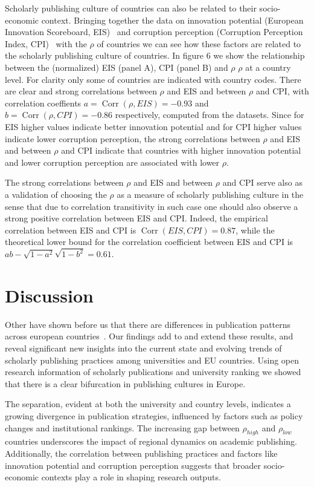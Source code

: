 \documentclass[amsfonts, amssymb, prl, superscriptaddress, notitlepage, twocolumn, nofootinbib]{revtex4-2}
\newcommand{\Corr}{\operatorname{Corr}}
\begin{document}
Scholarly publishing culture of countries can also be related to their socio-economic context. Bringing together the data on innovation potential (European Innovation Scoreboard, EIS)~\cite{european_innovation_scoreboard_2023} and corruption perception (Corruption Perception Index, CPI)~\cite{transparency_international_cpi_2022} with the $\rho$ of countries we can see how these factors are related to the scholarly publishing culture of countries. In figure 6 we show the relationship between the (normalized) EIS (panel A), CPI (panel B) and $\rho$ $\rho$ at a country level. For clarity only some of countries are indicated with country codes.
There are clear and strong correlations between $\rho$ and EIS and between $\rho$ and CPI, with correlation coeffients $a=\Corr(\rho, EIS)=-0.93$ and $b=\Corr(\rho, CPI)=-0.86$ respectively, computed from the datasets. Since for EIS higher values indicate better innovation potential and for CPI higher values indicate lower corruption perception, the strong correlations between $\rho$ and EIS and between $\rho$ and CPI indicate that countries with higher innovation potential and lower corruption perception are associated with lower $\rho$. 

The strong correlations between $\rho$ and EIS and between $\rho$ and CPI serve also as a validation of choosing the $\rho$ as a measure of scholarly publishing culture in the sense that due to correlation transitivity in such case one should also observe a strong positive correlation between EIS and CPI. Indeed, the empirical correlation between EIS and CPI is $\Corr(EIS, CPI)=0.87$, while the theoretical lower bound for the correlation coefficient between EIS and CPI is $ab-\sqrt{1-a^2}\sqrt{1-b^2}=0.61$.


\section{Discussion}
Other have shown before us that there are differences in publication patterns across european countries~\cite{kulczycki_publication_2018,sasvari2023current}. 
Our findings add to and extend these results, and reveal significant new insights into the current state and evolving trends of scholarly publishing practices among universities and EU countries. Using open research information of scholarly publications and university ranking we showed that there is a clear bifurcation in publishing cultures in Europe. 

The separation, evident at both the university and country levels, indicates a growing divergence in publication strategies, influenced by factors such as policy changes and institutional rankings. The increasing gap between $\rho_{high}$ and $\rho_{low}$ countries underscores the impact of regional dynamics on academic publishing. Additionally, the correlation between publishing practices and factors like innovation potential and corruption perception suggests that broader socio-economic contexts play a role in shaping research outputs. 
\end{document}
